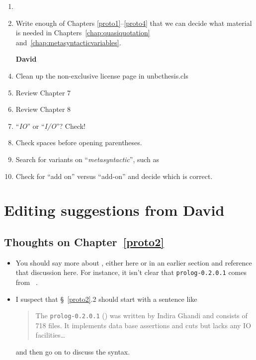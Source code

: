 \begin{scope}
\begin{enumerate}
\item

\item
  Write enough of Chapters \ref{proto1}--\ref{proto4} that we can decide
  what material is needed in Chapters~\ref{chap:quasiquotation}
  and~\ref{chap:metasyntacticvariables}.


\item [\textbf{David}]
\item Clean up the non-exclusive license page in unbcthesis.cls
\item Review Chapter 7
\item Review Chapter 8
\item ``\textit{IO}'' or ``\textit{I/O}''?  Check!
\item Check spaces before opening parentheses.
\item Search for variants on ``\textit{metasyntactic}'', such as
\item Check for ``add on'' versus ``add-on'' and decide which is correct.
\end{enumerate}

\section{Editing suggestions from David}\label{sec:edit-sugg-david}

\subsection{Thoughts on Chapter~\ref{proto2}}\label{subsec:thoughts-chapt-proto2}

\begin{itemize}
\item
  You should say more about \cite{prolog-lib}, either here or in an
  earlier section and reference that discussion here.  For instance, it
  isn't clear that \Verb!prolog-0.2.0.1! comes from~ \cite{prolog-lib}.
\item
  I suspect that \S~\ref{proto2}.2 should start with a sentence like 
  \begin{quote}\color[rgb]{0.3,0,0.6}\small\singlespacing
    The \Verb!prolog-0.2.0.1! (\cite{prolog-lib}) was written by Indira
    Ghandi and consists of 718  files.
    It implements data base assertions and cuts but lacks any IO
    facilities\dots
  \end{quote}
  and then go on to discuss the syntax.
\end{itemize}


\end{scope}

